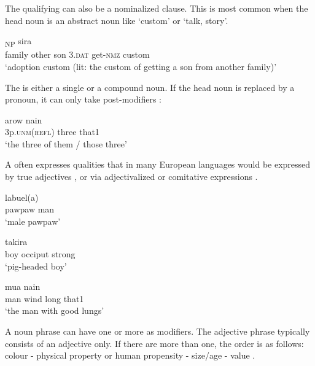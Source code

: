 The qualifying  can also be a nominalized clause. This is most common when the head noun is an abstract noun like  `custom'  or  `talk, story'.

\ea%
\label{ex:4:x414}
\gll {\ob}     \textsubscript{NP}  sira \\
    family  other  son  3.\textsc{dat}  get-\textsc{nmz}  custom  \\
\glt`adoption custom (lit: the custom of getting a son from another family)'
\z

The  is either a single or a compound noun.  If the head noun is replaced by a pronoun, it can only take post-modifiers :

\ea%
\label{ex:4:x415}
\gll {}  arow  nain  \\
   3p.\textsc{unm}(\textsc{refl})  three  that1   \\
\glt`the three of them / those three'
\z

A  often expresses qualities that in many European languages would be expressed by true adjectives , or via adjectivalized  or comitative expressions .

\ea%
\label{ex:4:x416}
\gll labuel(a)   \\
     pawpaw  man \\
\glt`male pawpaw'
\z

\ea%
\label{ex:4:x417}
\gll takira     \\
  boy  occiput  strong    \\
\glt`pig-headed boy'
\z

\ea%
\label{ex:4:x418}
\gll mua     nain  \\
   man  wind  long  that1   \\
\glt`the man with good lungs'
\z

A noun phrase can have one or more  as modifiers. The adjective phrase typically consists of an adjective only. If there are more  than one, the order is as follows: colour - physical property or human propensity - size/age - value .

